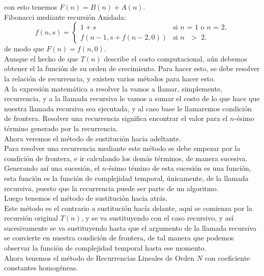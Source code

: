 \documentclass[12pt,twoside]{article}
\begin{document}
con esto tenemos $F(n)=B(n)+A(n)$.
\newline
\\ Fibonacci mediante recursión Anidada:
\begin{equation}
    f(n,s)=
    \begin{cases}
        1+s &\text{si $n$ = 1 o $n$ = 2,} \\
        f(n-1,s+f(n-2,0)) &\text{si $n$ $>$ 2.}
    \end{cases}
\end{equation}
de modo que $F(n)=f(n,0)$.
\newline
\\ Aunque el hecho de que $T(n)$ describe el costo computacional, aún debemos obtener el la función de su orden de crecimiento. Para hacer esto, se debe resolver la relación de recurrencia, y existen varios métodos para hacer esto.
\\ A la expresión matemática a resolver la vamos a llamar, simplemente, recurrencia, y a la llamada recursiva le vamos a sumar el costo de lo que hace que nuestra llamada recursiva sea ejecutada, y al caso base le llamaremos condición de frontera. Resolver una recurrencia significa encontrar el valor para el $n$-ésimo término generado por la recurrencia.
\newline
\\ Ahora veremos el método de sustitución hacia adeltante.
\\ Para resolver una recurrencia mediante este método se debe empezar por la condición de frontera, e ir calculando los demás términos, de manera sucesiva. Generando así una sucesión, el $n$-ésimo témino de esta sucesión es una función, esta función es la función de complejidad temporal, únicamente, de la llamada recursiva, puesto que la recurrencia puede ser parte de un algoritmo.
\newline
\\ Luego tenemos el método de sustitución hacia atrás.
\\ Este método es el contrario a sustitución hacía delante, aquí se comienza por la recursión original $T(n)$, y se va sustituyendo con el caso recursivo, y así sucesivamente se va sustituyendo hasta que el argumento de la llamada recursiva se convierte en nuestra condición de frontera, de tal manera que podemos observar la función de complejidad temporal hasta ese momento.
\newline
\\ Ahora tenemos el método de Recurrencias Lineales de Orden $N$ con coeficiente constantes homogéneas.
\end{document}
